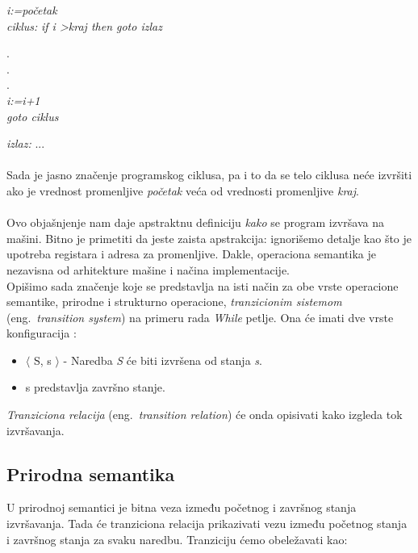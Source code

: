 \documentclass[a4paper]{article}
\begin{document}
{\hspace{4cm} \textit{i:=početak}\\
\textit{ciklus:} \hspace{3cm} \textit{if i \textgreater kraj then goto izlaz}
\begin{center}
.
\\.
\\.
\\ \textit{i:=i+1}
\\ \textit{goto ciklus}
\end{center}
\textit{izlaz:} \hspace{4cm} ...\\
\\Sada je jasno značenje programskog ciklusa, pa i to da se telo ciklusa neće izvršiti ako je vrednost promenljive \textit{početak} veća od vrednosti promenljive \textit{kraj}.\\
\\Ovo objašnjenje nam daje apstraktnu definiciju \textit{kako} se program izvršava na mašini. Bitno je primetiti da jeste zaista apstrakcija: ignorišemo detalje kao što je upotreba registara i adresa za promenljive. Dakle, operaciona semantika je nezavisna od arhitekture mašine i načina implementacije.\\

Opišimo sada značenje koje se predstavlja na isti način za obe vrste operacione semantike, prirodne i strukturno operacione, \textit{tranzicionim sistemom} (eng.~{\em transition system}) na primeru rada \emph{While} petlje. Ona će imati dve vrste konfiguracija \cite{willey}:
\begin{itemize}
	\item $\langle$ S, s $\rangle$ - Naredba \textit{S} će biti izvršena od stanja \textit{s}.
	\item s predstavlja završno stanje.
\end{itemize}
\textit{Tranziciona relacija} (eng.~{\em transition relation}) će onda opisivati kako izgleda tok izvršavanja. \\

\subsection{Prirodna semantika}

\qquad U prirodnoj semantici je bitna veza između početnog i završnog stanja izvršavanja. Tada će tranziciona relacija prikazivati vezu između početnog stanja i završnog stanja za svaku naredbu. Tranziciju ćemo obeležavati kao:

}
\end{document}
